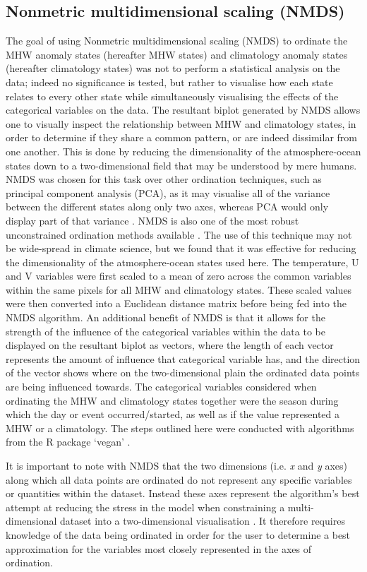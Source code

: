 \documentclass[utf8]{frontiersSCNS}
\begin{document}
\subsection{Nonmetric multidimensional scaling (NMDS)}
The goal of using Nonmetric multidimensional scaling (NMDS) to ordinate the MHW anomaly states (hereafter MHW states) and climatology anomaly states (hereafter climatology states) was not to perform a statistical analysis on the data; indeed no significance is tested, but rather to visualise how each state relates to every other state while simultaneously visualising the effects of the categorical variables on the data. The resultant biplot generated by NMDS allows one to visually inspect the relationship between MHW and climatology states, in order to determine if they share a common pattern, or are indeed dissimilar from one another. This is done by reducing the dimensionality of the atmosphere-ocean states down to a two-dimensional field that may be understood by mere humans. NMDS was chosen for this task over other ordination techniques, such as principal component analysis (PCA), as it may visualise all of the variance between the different states along only two axes, whereas PCA would only display part of that variance \citep{Paliy2016}. NMDS is also one of the most robust unconstrained ordination methods available \citep{Minchin1987}. The use of this technique may not be wide-spread in climate science, but we found that it was effective for reducing the dimensionality of the atmosphere-ocean states used here. The temperature, U and V variables were first scaled to a mean of zero across the common variables within the same pixels for all MHW and climatology states. These scaled values were then converted into a Euclidean distance matrix before being fed into the NMDS algorithm. An additional benefit of NMDS is that it allows for the strength of the influence of the categorical variables within the data to be displayed on the resultant biplot as vectors, where the length of each vector represents the amount of influence that categorical variable has, and the direction of the vector shows where on the two-dimensional plain the ordinated data points are being influenced towards. The categorical variables considered when ordinating the MHW and climatology states together were the season during which the day or event occurred/started, as well as if the value represented a MHW or a climatology. The steps outlined here were conducted with algorithms from the R package `vegan' \citep{Oksanen2017}.

It is important to note with NMDS that the two dimensions (i.e. \emph{x} and \emph{y} axes) along which all data points are ordinated do not represent any specific variables or quantities within the dataset. Instead these axes represent the algorithm's best attempt at reducing the stress in the model when constraining a multi-dimensional dataset into a two-dimensional visualisation \citep{Kruskal1964}. It therefore requires knowledge of the data being ordinated in order for the user to determine a best approximation for the variables most closely represented in the axes of ordination.
\end{document}
